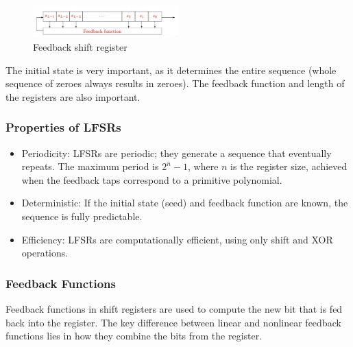 \begin{figure}[h!]
    \centering
    \includegraphics[width=0.5\textwidth]{img/LFSR.png}
    \caption{Feedback shift register}
\end{figure}

The initial state is very important, as it determines the entire sequence (whole sequence of zeroes always results in zeroes). The feedback function and length of the registers are also important.

\subsubsection{Properties of LFSRs}
\begin{itemize}
    \item Periodicity: LFSRs are periodic; they generate a sequence that eventually repeats. The maximum period is $2^n - 1$, where $n$ is the register size, achieved when the feedback taps correspond to a primitive polynomial.
    \item Deterministic: If the initial state (seed) and feedback function are known, the sequence is fully predictable.
    \item Efficiency: LFSRs are computationally efficient, using only shift and XOR operations.
\end{itemize}

\subsubsection{Feedback Functions}
Feedback functions in shift registers are used to compute the new bit that is fed back into the register. The key difference between linear and nonlinear feedback functions lies in how they combine the bits from the register.


